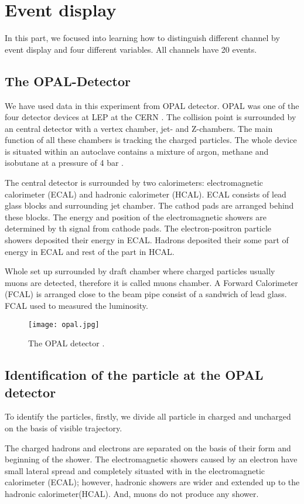 \clearpage
\section{Event display}
In this part, we focused into learning how to distinguish different channel by event display and four different variables. All channels have 20 events. 

\subsection{The OPAL-Detector}
We have used data in this experiment from OPAL detector. OPAL was one of the four detector devices at LEP at the CERN \cite{manual}. The collision point is surrounded by an central detector with  a vertex chamber, jet- and Z-chambers. The main function of all these chambers is tracking the charged particles. The whole device is situated within an autoclave contains a mixture of argon, methane and isobutane at a pressure of 4 bar \cite{manual}.

The central detector is surrounded by two calorimeters: electromagnetic calorimeter (ECAL) and hadronic calorimeter (HCAL). ECAL consists of lead glass blocks and surrounding jet chamber. The cathod pads are arranged behind these blocks. The energy and position of the electromagnetic showers are determined by th signal from cathode pads. The electron-positron particle showers deposited their energy in ECAL. Hadrons deposited their some part of energy in ECAL and rest of the part in HCAL. 

Whole set up surrounded by draft chamber where charged particles usually muons are detected, therefore it is called muons chamber. A Forward Calorimeter (FCAL) is arranged close to the beam pipe consist of a sandwich of lead glass. FCAL used to measured the luminosity.


 \begin{figure}[H]
 	\centering
 	\texttt{[image: opal.jpg]}
 	\caption{ The OPAL detector \cite{manual}. }
 	\label{fig:OPAL}
 \end{figure}

\subsection{Identification of the particle at the OPAL detector}
To identify the particles, firstly, we divide all particle in charged and uncharged on the basis of visible trajectory.

The charged hadrons and electrons are separated on the basis of their form and beginning of the shower. The electromagnetic showers caused by an electron have small lateral spread and completely situated with in the electromagnetic calorimeter (ECAL); however, hadronic showers are wider and extended up to the hadronic calorimeter(HCAL). And, muons do not produce any shower.

